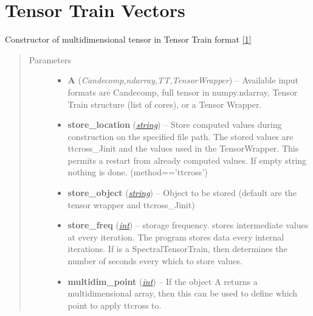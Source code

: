 \documentclass[a4paper,10pt,english]{sphinxmanual}
\begin{document}
\section{Tensor Train Vectors}
\label{api-ttvec:tensor-train-vectors}\label{api-ttvec::doc}\label{api-ttvec:module-TensorToolbox}

\begin{fulllineitems}
\label{api-ttvec:TensorToolbox.core.TTvec}
Constructor of multidimensional tensor in Tensor Train format {\hyperref[zrefs:oseledets2011]{{[}1{]}}}
\begin{quote}\begin{description}
\item[{Parameters}] \leavevmode\begin{itemize}
\item {} 
\textbf{A} (\emph{Candecomp,ndarray,TT,TensorWrapper}) -- Available input formats are Candecomp, full tensor in numpy.ndarray, Tensor Train structure (list of cores), or a Tensor Wrapper.

\item {} 
\textbf{store\_location} (\href{http://docs.python.org/library/string.html\#module-string}{\emph{string}}) -- Store computed values during construction on the specified file path. The stored values are ttcross\_Jinit and the values used in the TensorWrapper. This permits a restart from already computed values. If empty string nothing is done. (method=='ttcross')

\item {} 
\textbf{store\_object} (\href{http://docs.python.org/library/string.html\#module-string}{\emph{string}}) -- Object to be stored (default are the tensor wrapper and ttcross\_Jinit)

\item {} 
\textbf{store\_freq} (\href{http://docs.python.org/library/functions.html\#int}{\emph{int}}) -- storage frequency.  stores intermediate values at every iteration. The program stores data every  internal iterations. If  is a SpectralTensorTrain, then  determines the number of seconds every which to store values.

\item {} 
\textbf{multidim\_point} (\href{http://docs.python.org/library/functions.html\#int}{\emph{int}}) -- If the object A returns a multidimensional array, then this can be used to define which point to apply ttcross to.


\end{itemize}
\end{description}
\end{quote}
\end{fulllineitems}
\end{document}
